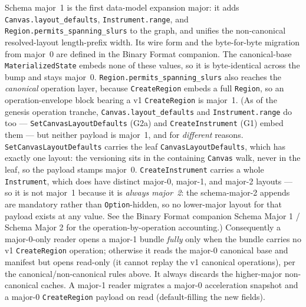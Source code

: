 \documentclass[11pt,letterpaper]{report}
\newcommand{\sectionsc}[1]{{\addfontfeatures{Letters=SmallCaps}#1}}
\begin{document}
Schema major~1 is the first data-model expansion major: it adds
\texttt{Canvas.layout\_defaults}, \texttt{Instrument.range}, and
\texttt{Region.permits\_spanning\_slurs} to the graph, and unifies the
non-canonical resolved-layout length-prefix width. Its wire form and the
byte-for-byte migration from major~0 are defined in the Binary Format
companion. The canonical-base \texttt{MaterializedState} embeds none of these
values, so it is byte-identical across the bump and stays major~0.
\texttt{Region.permits\_spanning\_slurs} also reaches the \emph{canonical}
operation layer, because \texttt{CreateRegion} embeds a full \texttt{Region},
so an operation-envelope block bearing a v1 \texttt{CreateRegion} is major~1.
(As of the genesis operation tranche, \texttt{Canvas.layout\_defaults} and
\texttt{Instrument.range} do too --- \texttt{SetCanvasLayoutDefaults}
(G2a) and \texttt{CreateInstrument} (G1) embed them --- but neither payload
is major~1, and for \emph{different} reasons.
\texttt{SetCanvasLayoutDefaults} carries the leaf
\texttt{CanvasLayoutDefaults}, which has exactly one layout: the versioning
sits in the containing \texttt{Canvas} walk, never in the leaf, so the
payload stamps major~0. \texttt{CreateInstrument} carries a whole
\texttt{Instrument}, which does have distinct major-0, major-1, and major-2
layouts --- so it is not major~1 because it is \emph{always major~2}: the
schema-major-2 appends are mandatory rather than \texttt{Option}-hidden, so
no lower-major layout for that payload exists at any value. See the Binary
Format companion \sectionsc{Schema Major 1} / \sectionsc{Schema Major 2} for
the operation-by-operation accounting.)
Consequently a major-0-only reader opens a major-1 bundle \emph{fully} only
when the bundle carries no v1 \texttt{CreateRegion} operation; otherwise it
reads the major-0 canonical base and manifest but opens read-only (it cannot
replay the v1 canonical operations), per the canonical/non-canonical rules
above. It always discards the higher-major non-canonical caches. A major-1
reader migrates a major-0 acceleration snapshot and a major-0
\texttt{CreateRegion} payload on read (default-filling the new fields).
\end{document}
